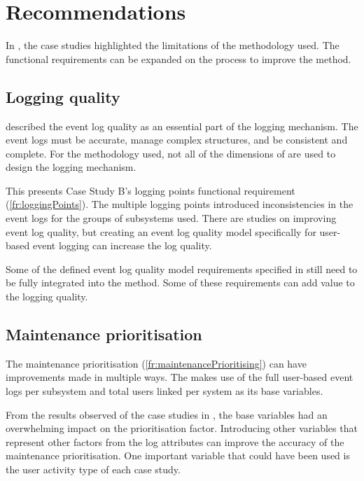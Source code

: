 \section{Recommendations}
In , the case studies highlighted the limitations of the methodology used. The functional requirements can be expanded on the process to improve the method.

\subsection{Logging quality}
 described the event log quality as an essential part of the logging mechanism. The event logs must be accurate, manage complex structures, and be consistent and complete. For the methodology used, not all of the dimensions of  are used to design the logging mechanism.\par This presents Case Study B's logging points functional requirement (\ref{fr:loggingPoints}). The multiple logging points introduced inconsistencies in the event logs for the groups of subsystems used. There are studies on improving event log quality, but creating an event log quality model specifically for user-based event logging can increase the log quality. \par Some of the defined event log quality model requirements specified in  still need to be fully integrated into the method. Some of these requirements can add value to the logging quality.

\subsection{Maintenance prioritisation}
The maintenance prioritisation (\ref{fr:maintenancePrioritising}) can have improvements made in multiple ways. The  makes use of the full user-based event logs per subsystem and total users linked per system as its base variables.\par From the results observed of the case studies in , the base variables had an overwhelming impact on the prioritisation factor. Introducing other variables that represent other factors from the log attributes can improve the accuracy of the maintenance prioritisation. One important variable that could have been used is the user activity type of each case study.

